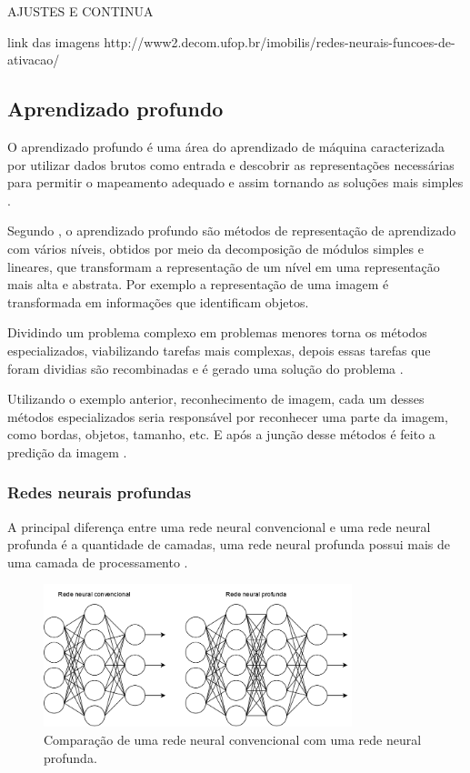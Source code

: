 \documentclass[
	12pt,				%
	openright,			%
	twoside,			%
	a4paper,			%
	english,			%
	french,				%
	spanish,			%
	brazil				%
	]{abntex2}
\begin{document}
AJUSTES E CONTINUA

link das imagens http://www2.decom.ufop.br/imobilis/redes-neurais-funcoes-de-ativacao/

\subsection{Aprendizado profundo}

O aprendizado profundo é uma área do aprendizado de máquina caracterizada por utilizar dados brutos como entrada e descobrir as representações necessárias para permitir o mapeamento adequado e assim tornando as soluções mais simples .

Segundo , o aprendizado profundo são métodos de representação de aprendizado com vários níveis, obtidos por meio da decomposição de módulos simples e lineares, que transformam a representação de um nível em uma representação mais alta e abstrata. Por exemplo a representação de uma imagem é transformada em informações que identificam objetos.

Dividindo um problema complexo em problemas menores torna os métodos especializados, viabilizando tarefas mais complexas, depois essas tarefas que foram dividias são recombinadas e é gerado uma solução do problema \cite{marti2017aprendizado}.

Utilizando o exemplo anterior, reconhecimento de imagem, cada um desses métodos especializados seria responsável por reconhecer uma parte da imagem, como bordas, objetos, tamanho, etc. E após a junção desse métodos é feito a predição da imagem \cite{marti2017aprendizado}.

\subsubsection{Redes neurais profundas}

A principal diferença entre uma rede neural convencional e uma rede neural profunda é a quantidade de camadas, uma rede neural profunda possui mais de uma camada de processamento .

\begin{figure}[H]
	\centering
	\includegraphics[width=0.8\textwidth]{figures/redes_neurais.png}
	\caption{Comparação de uma rede neural convencional com uma rede neural profunda.}	
	\label{fig:redes_neurais}
\end{figure}
\end{document}
